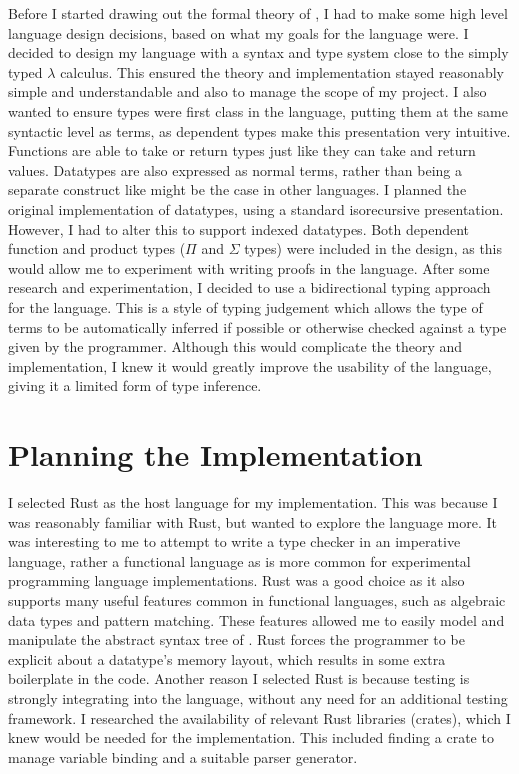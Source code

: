 \documentclass[12pt,a4paper,twoside]{report}
\begin{document}
Before I started drawing out the formal theory of \pimu{}, I had to make some high level language design decisions, based on what my goals for the language were.
I decided to design my language with a syntax and type system close to the simply typed \(\lambda\) calculus.
This ensured the theory and implementation stayed reasonably simple and understandable and also to manage the scope of my project.
I also wanted to ensure types were first class in the language, putting them at the same syntactic level as terms, as dependent types make this presentation very intuitive.
Functions are able to take or return types just like they can take and return values.
Datatypes are also expressed as normal terms, rather than being a separate construct like might be the case in other languages.
I planned the original implementation of datatypes, using a standard isorecursive presentation.
However, I had to alter this to support indexed datatypes.
Both dependent function and product types (\(\Pi\) and \(\Sigma\) types) were included in the design, as this would allow me to experiment with writing proofs in the language.
After some research and experimentation, I decided to use a bidirectional typing approach \cite{pierce98} for the language.
This is a style of typing judgement which allows the type of terms to be automatically inferred if possible or otherwise checked against a type given by the programmer.
Although this would complicate the theory and implementation, I knew it would greatly improve the usability of the language, giving it a limited form of type inference.

\section{Planning the Implementation}

I selected Rust as the host language for my implementation.
This was because I was reasonably familiar with Rust, but wanted to explore the language more.
It was interesting to me to attempt to write a type checker in an imperative language, rather a functional language as is more common for experimental programming language implementations.
Rust was a good choice as it also supports many useful features common in functional languages, such as algebraic data types and pattern matching.
These features allowed me to easily model and manipulate the abstract syntax tree of \pimu{}.
Rust forces the programmer to be explicit about a datatype's memory layout, which results in some extra boilerplate in the code.
Another reason I selected Rust is because testing is strongly integrating into the language, without any need for an additional testing framework.
I researched the availability of relevant Rust libraries (crates), which I knew would be needed for the implementation.
This included finding a crate to manage variable binding and a suitable parser generator.
\end{document}
